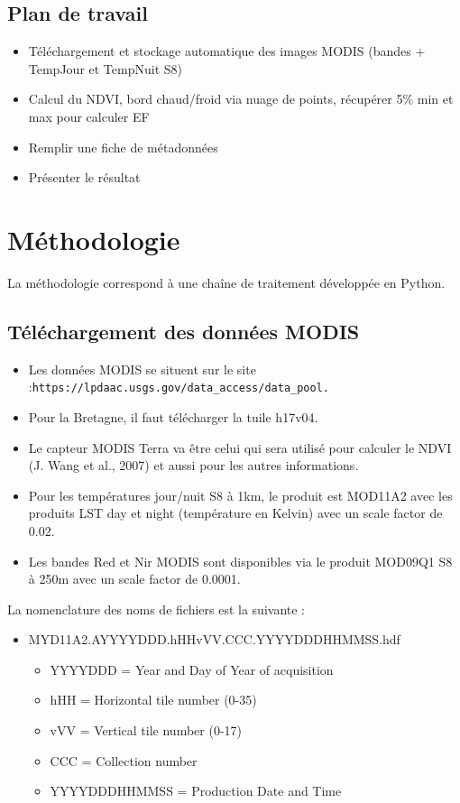 \documentclass[10pt,a4paper]{article}
\begin{document}
\subsection{Plan de travail}
\begin{itemize}
\item Téléchargement et stockage automatique des images MODIS (bandes + TempJour et TempNuit S8)
\item Calcul du NDVI, bord chaud/froid via nuage de points, récupérer 5\% min et max pour calculer EF
\item Remplir une fiche de métadonnées
\item Présenter le résultat
\end{itemize}

\section{Méthodologie}

La méthodologie correspond à une chaîne de traitement développée en Python.

\subsection{Téléchargement des données MODIS}

\begin{itemize}
\item Les données MODIS se situent sur le site :\newline \verb!https://lpdaac.usgs.gov/data_access/data_pool.!
\item Pour la Bretagne, il faut télécharger la tuile h17v04. 
\item Le capteur MODIS Terra va être celui qui sera utilisé pour calculer le NDVI (J. Wang et al., 2007) et aussi pour les autres informations.
\item Pour les températures jour/nuit S8 à 1km, le produit est MOD11A2 avec les produits LST day et night (température en Kelvin) avec un scale factor de 0.02.
\item Les bandes Red et Nir MODIS sont disponibles via le produit MOD09Q1 S8 à 250m avec un scale factor de 0.0001.
\end{itemize}  

La nomenclature des noms de fichiers est la suivante :
\begin{itemize}
\item MYD11A2.AYYYYDDD.hHHvVV.CCC.YYYYDDDHHMMSS.hdf
\begin{itemize}
\item YYYYDDD = Year and Day of Year of acquisition
\item hHH = Horizontal tile number (0-35)
\item vVV = Vertical tile number (0-17)
\item CCC = Collection number
\item YYYYDDDHHMMSS = Production Date and Time
\end{itemize}
\end{itemize}
\end{document}
